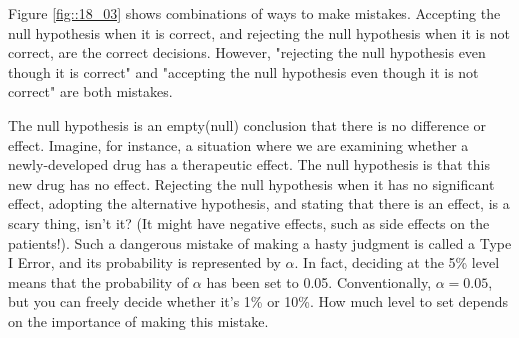 \documentclass{ltjsbook}
\begin{document}

Figure \ref{fig::18_03} shows combinations of ways to make mistakes. Accepting the null hypothesis when it is correct, and rejecting the null hypothesis when it is not correct, are the correct decisions. However, "rejecting the null hypothesis even though it is correct" and "accepting the null hypothesis even though it is not correct" are both mistakes.

The null hypothesis is an empty(null) conclusion that there is no difference or effect. Imagine, for instance, a situation where we are examining whether a newly-developed drug has a therapeutic effect. The null hypothesis is that this new drug has no effect. Rejecting the null hypothesis when it has no significant effect, adopting the alternative hypothesis, and stating that there is an effect, is a scary thing, isn't it? (It might have negative effects, such as side effects on the patients!). Such a dangerous mistake of making a hasty judgment is called a Type I Error, and its probability is represented by $\alpha$. In fact, deciding at the 5\% level means that the probability of $\alpha$ has been set to 0.05. Conventionally, $\alpha=0.05$, but you can freely decide whether it's 1\% or 10\%. How much level to set depends on the importance of making this mistake.
\end{document}
